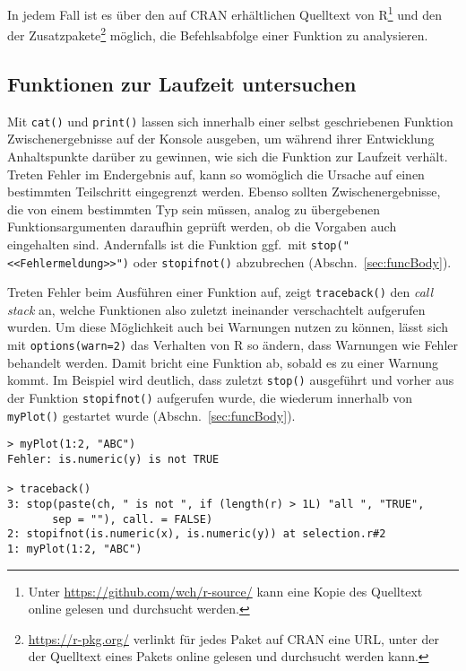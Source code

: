 In jedem Fall ist es über den auf CRAN erhältlichen Quelltext von R\footnote{Unter \url{https://github.com/wch/r-source/} kann eine Kopie des Quelltext online gelesen und durchsucht werden.} und den der Zusatzpakete\footnote{\url{https://r-pkg.org/} verlinkt für jedes Paket auf CRAN eine URL, unter der der Quelltext eines Pakets online gelesen und durchsucht werden kann.} möglich, die Befehlsabfolge einer Funktion zu analysieren.

\subsection{Funktionen zur Laufzeit untersuchen}
\label{sec:debugRun}

Mit \lstinline!cat()! und \lstinline!print()! lassen sich innerhalb einer selbst geschriebenen Funktion Zwischenergebnisse auf der Konsole ausgeben, um während ihrer Entwicklung Anhaltspunkte darüber zu gewinnen, wie sich die Funktion zur Laufzeit verhält. Treten Fehler im Endergebnis auf, kann so womöglich die Ursache auf einen bestimmten Teilschritt eingegrenzt werden. Ebenso sollten Zwischenergebnisse, die von einem bestimmten Typ sein müssen, analog zu übergebenen Funktionsargumenten daraufhin geprüft werden, ob die Vorgaben auch eingehalten sind. Andernfalls ist die Funktion ggf.\ mit \lstinline!stop("<<Fehlermeldung>>")! oder \lstinline!stopifnot()! abzubrechen (Abschn.\ \ref{sec:funcBody}).

Treten Fehler beim Ausführen einer Funktion auf, zeigt \lstinline!traceback()! den \emph{call stack} an, welche Funktionen also zuletzt ineinander verschachtelt aufgerufen wurden. Um diese Möglichkeit auch bei Warnungen nutzen zu können, lässt sich mit \lstinline!options(warn=2)! das Verhalten von R so ändern, dass Warnungen wie Fehler behandelt werden. Damit bricht eine Funktion ab, sobald es zu einer Warnung kommt. Im Beispiel wird deutlich, dass zuletzt \lstinline!stop()! ausgeführt und vorher aus der Funktion \lstinline!stopifnot()! aufgerufen wurde, die wiederum innerhalb von \lstinline!myPlot()! gestartet wurde (Abschn.\ \ref{sec:funcBody}).
\begin{lstlisting}
> myPlot(1:2, "ABC")
Fehler: is.numeric(y) is not TRUE

> traceback()
3: stop(paste(ch, " is not ", if (length(r) > 1L) "all ", "TRUE",
       sep = ""), call. = FALSE)
2: stopifnot(is.numeric(x), is.numeric(y)) at selection.r#2
1: myPlot(1:2, "ABC")
\end{lstlisting}

